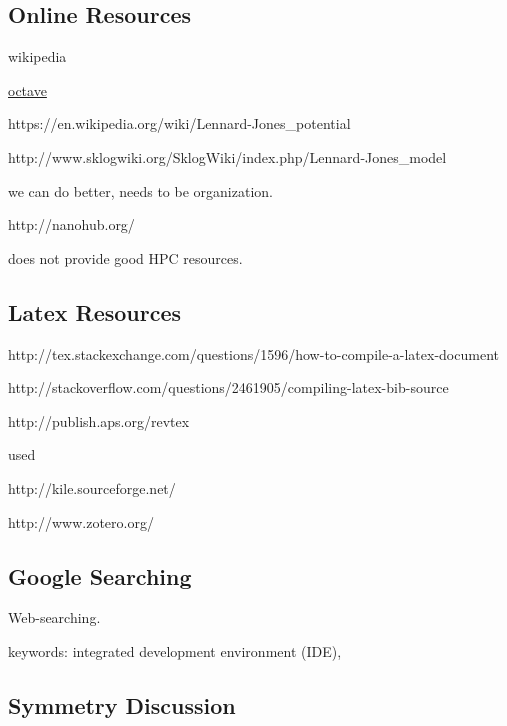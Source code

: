 \subsection{Online Resources}

wikipedia

\href{http://www.sklogwiki.org/SklogWiki/index.php/Main_Page}
{octave}

https://en.wikipedia.org/wiki/Lennard-Jones_potential

http://www.sklogwiki.org/SklogWiki/index.php/Lennard-Jones_model

we can do better, needs to be organization. 

http://nanohub.org/

does not provide good HPC resources. 

\subsection{Latex Resources}

http://tex.stackexchange.com/questions/1596/how-to-compile-a-latex-document

http://stackoverflow.com/questions/2461905/compiling-latex-bib-source

http://publish.aps.org/revtex

used 

http://kile.sourceforge.net/

http://www.zotero.org/







\subsection{Google Searching}

Web-searching. 

keywords: integrated development environment (IDE), 

\subsection{Symmetry Discussion}

